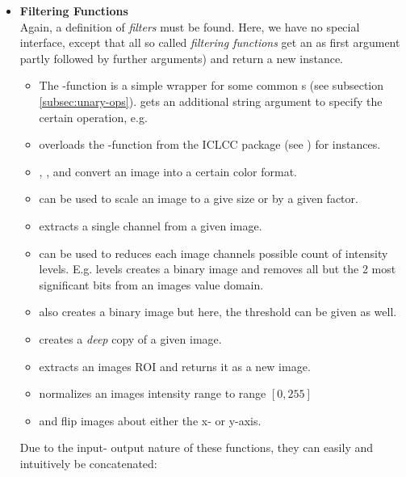\begin{itemize}
\item \textbf{Filtering Functions}\\
Again, a definition of \emph{filters} must be found. Here, we have no special interface, except that all so called \emph{filtering functions} get an  as first argument partly followed by further arguments) and return a new  instance.\\
\begin{itemize}
\item The -function is a simple wrapper for some common s (see subsection \ref{subsec:unary-ops}).   gets an additional string argument to specify the certain operation, e.g.
\item {} overloads the -function from the ICLCC package (see ) for  instances.
\item {}, ,  and  convert an image into a certain color format.
\item {} can be used to scale an image to a give size or by a given factor.
\item {} extracts a single channel from a given image.
\item {} can be used to reduces each image channels possible count of intensity levels. E.g. levels  creates a binary image and  removes all but the 2 most significant bits from an images value domain.
\item {} also creates a binary image but here, the threshold can be given as well.
\item {} creates a \emph{deep} copy of a given image.
\item {} extracts an images ROI and returns it as a new image.
\item {} normalizes an images intensity range to range $[0,255]$
\item {} and  flip images about either the x- or y-axis.
\end{itemize}
Due to the input- output nature of these functions, they can easily and intuitively be concatenated:


\end{itemize}
